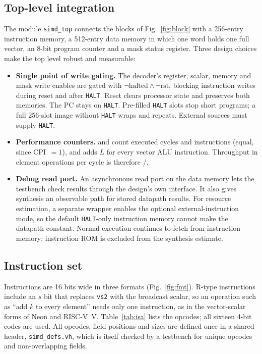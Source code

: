 \documentclass[conference]{IEEEtran}
\begin{document}
\subsection{Top-level integration}
The module \texttt{simd\_top} connects the blocks of Fig.~\ref{fig:block} with
a 256-entry instruction memory, a 512-entry data memory in which one word holds
one full vector, an 8-bit program counter and a mask status register.
Three design choices make the top level robust and measurable:
\begin{itemize}
\item \textbf{Single point of write gating.} The decoder's register, scalar,
      memory and mask write enables are gated with
      $\neg\text{halted}\land\neg\text{rst}$, blocking instruction writes
      during reset and after \texttt{HALT}. Reset clears processor state and
      preserves both memories. The PC stays on \texttt{HALT}. Pre-filled
      \texttt{HALT} slots stop short programs; a full 256-slot image without
      \texttt{HALT} wraps and repeats. External sources must supply \texttt{HALT}.
\item \textbf{Performance counters.}  and
       count executed cycles and instructions (equal, since
      CPI~$=1$), and  adds $L$ for every vector ALU
      instruction. Throughput in element operations per cycle is therefore
      /.
\item \textbf{Debug read port.} An asynchronous read port on the data memory lets
      the testbench check results through the design's own interface. It also
      gives synthesis an observable path for stored datapath results. For resource
      estimation, a separate wrapper enables the optional external-instruction
      mode, so the default \texttt{HALT}-only instruction memory cannot make the
      datapath constant. Normal execution continues to fetch from instruction
      memory; instruction ROM is excluded from the synthesis estimate.
\end{itemize}
\subsection{Instruction set}
Instructions are 16 bits wide in three formats (Fig.~\ref{fig:fmt}). R-type
instructions include an $s$ bit that replaces \texttt{vs2} with the broadcast
scalar, so an operation such as ``add $k$ to every element'' needs only one
instruction, as in the vector-scalar forms of Neon and RISC-V~V. Table~\ref{tab:isa}
lists the opcodes; all sixteen 4-bit codes are used. All opcodes, field
positions and sizes are defined once in a shared header, \texttt{simd\_defs.vh},
which is itself checked by a testbench for unique opcodes and non-overlapping
fields.
\end{document}
